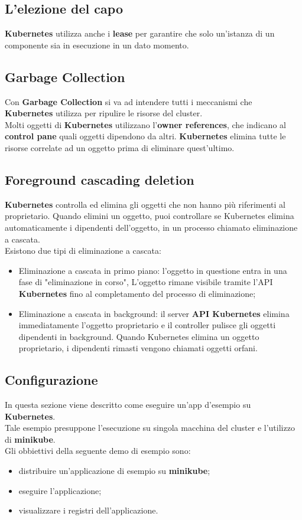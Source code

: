 \documentclass{article}
\begin{document}
\subsection{L'elezione del capo}
\textbf{Kubernetes} utilizza anche i \textbf{lease} per garantire che solo un'istanza di un componente sia in esecuzione in un dato momento. 
\subsection{Garbage Collection}
Con \textbf{Garbage Collection} si va ad intendere tutti i meccanismi che \textbf{Kubernetes} utilizza per ripulire le risorse del cluster.\\
Molti oggetti di \textbf{Kubernetes} utilizzano l'\textbf{owner references}, che indicano al \textbf{control pane} quali oggetti dipendono da altri. \textbf{Kubernetes} elimina tutte le risorse correlate ad un oggetto prima di eliminare quest'ultimo.
\subsection{Foreground cascading deletion}
\textbf{Kubernetes} controlla ed elimina gli oggetti che non hanno più riferimenti al proprietario. Quando elimini un oggetto, puoi controllare se Kubernetes elimina automaticamente i dipendenti dell'oggetto, in un processo chiamato eliminazione a cascata. \\
Esistono due tipi di eliminazione a cascata:
\begin{itemize}
    \item Eliminazione a cascata in primo piano: l'oggetto in questione entra in una fase di "eliminazione in corso", L'oggetto rimane visibile tramite l'API \textbf{Kubernetes} fino al completamento del processo di eliminazione;
    \item Eliminazione a cascata in background: il server \textbf{API Kubernetes} elimina immediatamente l'oggetto proprietario e il controller pulisce gli oggetti dipendenti in background. Quando Kubernetes elimina un oggetto proprietario, i dipendenti rimasti vengono chiamati oggetti orfani.
\end{itemize} 
\subsection{Configurazione}
In questa sezione viene descritto come eseguire un'app d'esempio su \textbf{Kubernetes}.\\
Tale esempio presuppone l'esecuzione su singola macchina del cluster e l'utilizzo di \textbf{minikube}.\\
Gli obbiettivi della seguente demo di esempio sono: 
\begin{itemize}
    \item distribuire un'applicazione di esempio su \textbf{minikube};
    \item eseguire l'applicazione;
    \item visualizzare i registri dell'applicazione.
\end{itemize}
\end{document}
